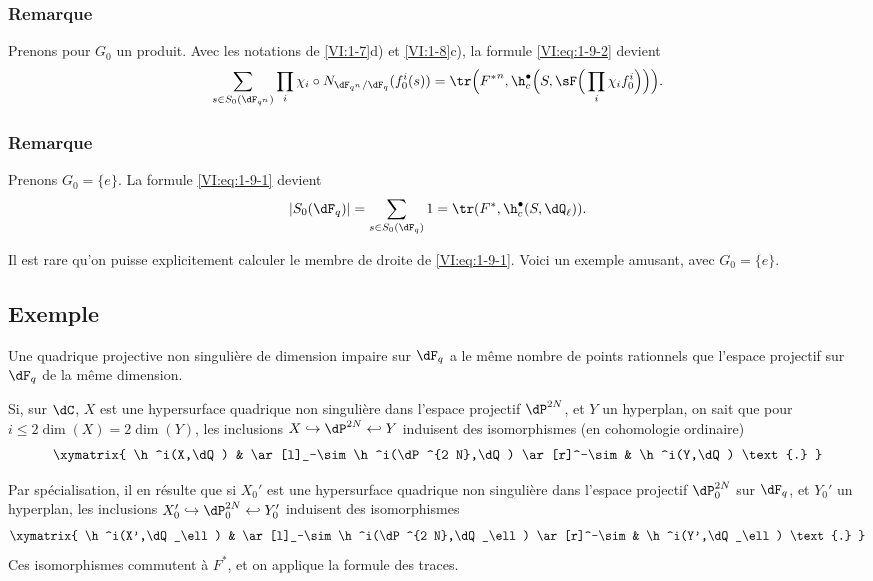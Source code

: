 \addtocounter{subsubsection}{2}
\subsubsection{Remarque}\label{VI:1-9-3}

Prenons pour $G_0$ un produit. Avec les notations de \ref{VI:1-7}d) et 
\ref{VI:1-8}c), la formule \eqref{VI:eq:1-9-2} devient 
\[
  \sum_{s\in S_0(\dF_{q^n})} \prod_i \chi_i\circ N_{\dF_{q^n}/\dF_q} (f_0^i(s)) = \tr\Big({F^\ast}^n, \h_c^\bullet\Big(S,\sF\Big(\prod_i \chi_i f_0^i\Big)\Big)\Big) \text{.}
\]





\subsubsection{Remarque}\label{VI:1-9-4}

Prenons $G_0=\{e\}$. La formule \eqref{VI:eq:1-9-1} devient 
\[
  \left|S_0(\dF_q)\right| = \sum_{s\in S_0(\dF_q)} 1 = \tr(F^\ast,\h_c^\bullet(S,\dQ_\ell)) \text{.}
\]

Il est rare qu'on puisse explicitement calculer le membre de droite de 
\eqref{VI:eq:1-9-1}. Voici un exemple amusant, avec $G_0=\{e\}$. 





\subsection{Exemple}\label{VI:1-10}

Une quadrique projective non singulière de dimension impaire sur \texorpdfstring{$\dF_q$}{Fq} a le même nombre de points rationnels que l'espace projectif sur \texorpdfstring{$\dF_q$}{Fq} de la même dimension.

Si, sur $\dC$, $X$ est une hypersurface quadrique non singulière dans 
l'espace projectif $\dP^{2 N}$, et $Y$ un hyperplan, on sait que pour 
$i\leqslant 2\dim(X)=2\dim(Y)$, les inclusions 
$X\hookrightarrow \dP^{2 N}\hookleftarrow Y$ induisent des isomorphismes (en 
cohomologie ordinaire) 
\[\xymatrix{
  \h^i(X,\dQ) 
    & \ar[l]_-\sim \h^i(\dP^{2 N},\dQ) \ar[r]^-\sim 
    & \h^i(Y,\dQ) \text{.}
}\]

Par spécialisation, il en résulte que si $X_0'$ est une hypersurface 
quadrique non singulière dans l'espace projectif $\dP_0^{2 N}$ sur $\dF_q$, 
et $Y_0'$ un hyperplan, les inclusions 
$X_0'\hookrightarrow \dP_0^{2 N}\hookleftarrow Y_0'$ induisent des 
isomorphismes 
\[\xymatrix{
  \h^i(X',\dQ_\ell) 
    & \ar[l]_-\sim \h^i(\dP^{2 N},\dQ_\ell) \ar[r]^-\sim 
    & \h^i(Y',\dQ_\ell) \text{.}
}\]
Ces isomorphismes commutent à $F^\ast$, et on applique la formule des traces. 





